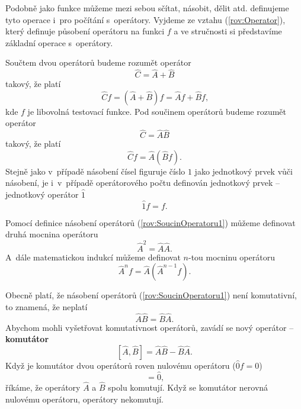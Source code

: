 Podobně jako funkce můžeme mezi sebou sčítat, násobit, dělit atd. definujeme tyto operace i~pro počítání s~operátory. Vyjdeme ze vztahu (\ref{rov:Operator}), který definuje působení operátoru na funkci $f$ a ve stručnosti si představíme základní operace s~operátory.

Součtem dvou operátorů budeme rozumět operátor
\begin{equation}
\hat{C} = \hat{A}+\hat{B}
\label{rov:SoucetOperatoru1}
\end{equation}
takový, že platí
\begin{equation}
\hat{C}f = (\hat{A}+\hat{B})f=\hat{A}f + \hat{B}f \mbox{,}
\label{rov:SoucetOperatoru2}
\end{equation}
kde $f$ je libovolná testovací funkce. Pod součinem operátorů budeme rozumět operátor
\begin{equation}
\hat{C} = \hat{A}\hat{B}
\label{rov:SoucinOperatoru1}
\end{equation}
takový, že platí
\begin{equation}
\hat{C}f = \hat{A}(\hat{B}f) \mbox{.}
\label{rov:SoucinOperatoru2}
\end{equation}
Stejně jako v~případě násobení čísel figuruje číslo $1$ jako jednotkový prvek vůči násobení, je i~v~případě operátorového počtu definován jednotkový prvek -- jednotkový operátor $\hat{1}$
\begin{equation}
\hat{1} f = f \mbox{.}
\label{rov:JednotkovyOperator}
\end{equation}

\noindent Pomocí definice násobení operátorů (\ref{rov:SoucinOperatoru1}) můžeme definovat druhá mocnina operátoru
\begin{equation}
\hat{A}^2 = \hat{A}\hat{A} \mbox{.}
\label{rov:KvadratOperatoru} 
\end{equation}
A~dále matematickou indukcí můžeme definovat $n$-tou mocninu operátoru
\begin{equation}
\hat{A}^n f = \hat{A} (\hat{A}^{n-1} f) \mbox{.}
\label{rov:MocninaOperatoru}
\end{equation}

Obecně platí, že násobení operátorů (\ref{rov:SoucinOperatoru1}) není komutativní, to znamená, že neplatí
\begin{equation}
\hat{A}\hat{B} = \hat{B}\hat{A} \mbox{.}
\label{rov:KomutativnostOperatoru}
\end{equation}
Abychom mohli vyšetřovat komutativnost operátorů, zavádí se nový operátor -- \textbf{komutátor}
\begin{equation}
\boxed{[\hat{A},\hat{B}] = \hat{A}\hat{B}-\hat{B}\hat{A} \mbox{.}}
\label{rov:KomutatorOperatoru}
\end{equation}
Když je komutátor dvou operátorů roven nulovému operátoru ($\hat{0}f=0$)
\begin{equation}
[\hat{A},\hat{B}] = \hat{0} \mbox{,}
\label{rov:Komutator1}
\end{equation}
říkáme, že operátory $\hat{A}$ a $\hat{B}$ spolu komutují. Když se komutátor nerovná nulovému operátoru, operátory nekomutují.

